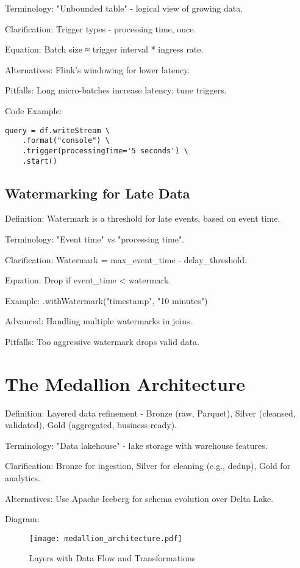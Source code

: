\documentclass[11pt]{article}
\begin{document}
Terminology: "Unbounded table" - logical view of growing data.

Clarification: Trigger types - processing time, once.

Equation: Batch size ≈ trigger interval * ingress rate.

Alternatives: Flink's windowing for lower latency.

Pitfalls: Long micro-batches increase latency; tune triggers.

Code Example:
\begin{verbatim}
query = df.writeStream \
    .format("console") \
    .trigger(processingTime='5 seconds') \
    .start()
\end{verbatim}

\subsection{Watermarking for Late Data}
Definition: Watermark is a threshold for late events, based on event time.

Terminology: "Event time" vs "processing time".

Clarification: Watermark = max_event_time - delay_threshold.

Equation: Drop if event_time < watermark.

Example: .withWatermark("timestamp", "10 minutes")

Advanced: Handling multiple watermarks in joins.

Pitfalls: Too aggressive watermark drops valid data.

\section{The Medallion Architecture}
Definition: Layered data refinement - Bronze (raw, Parquet), Silver (cleansed, validated), Gold (aggregated, business-ready).

Terminology: "Data lakehouse" - lake storage with warehouse features.

Clarification: Bronze for ingestion, Silver for cleaning (e.g., dedup), Gold for analytics.

Alternatives: Use Apache Iceberg for schema evolution over Delta Lake.

Diagram:
\begin{figure}[h]
    \centering
    \texttt{[image: medallion\_architecture.pdf]}
    \caption{Layers with Data Flow and Transformations}
\end{figure}
\end{document}
